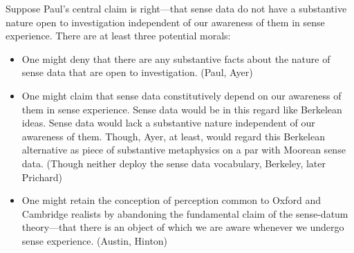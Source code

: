 \documentclass[11pt]{article}
\begin{document}
Suppose Paul's central claim is right---that sense data do not have a substantive nature open to investigation independent of our awareness of them in sense experience. There are at least three potential morals:

\begin{itemize}
	\item One might deny that there are any substantive facts about the nature of sense data that are open to investigation. (Paul, Ayer)
	\item One might claim that sense data constitutively depend on our awareness of them in sense experience. Sense data would be in this regard like Berkelean ideas. Sense data would lack a substantive nature independent of our awareness of them. Though, Ayer, at least, would regard this Berkelean alternative as piece of substantive metaphysics on a par with Moorean sense data. (Though neither deploy the sense data vocabulary, Berkeley, later Prichard)
	\item One might retain the conception of perception common to Oxford and Cambridge realists by abandoning the fundamental claim of the sense-datum theory---that there is an object of which we are aware whenever we undergo sense experience. (Austin, Hinton)
\end{itemize}



 

\end{document}
